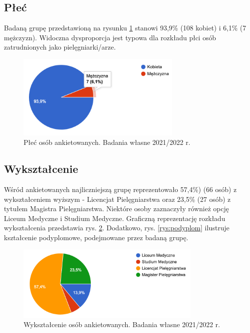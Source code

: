 \documentclass[a4paper,12pt,twoside,openright]{mwrep}
\begin{document}
\subsection*{Płeć}

Badaną grupę przedstawioną  na rysunku \ref{rys:plec} stanowi  93,9\%  (108 kobiet) i  6,1\%  (7 mężczyzn). Widoczna dysproporcja jest typowa dla rozkładu płci osób zatrudnionych jako pielęgniarki/arze.

\begin{figure}[H]
\centering
\includegraphics[width=8cm]{char_gr_bad/plec00}
\caption{Płeć osób ankietowanych. Badania własne 2021/2022 r.}
\label{rys:plec}
\end{figure}


\subsection*{Wykształcenie}


Wśród ankietowanych najliczniejszą grupę reprezentowało 57,4\%) (66 osób) z wykształceniem wyższym - Licencjat Pielęgniarstwa oraz  23,5\%  (27 osób) z tytułem Magistra Pielęgniarstwa. Niektóre osoby zaznaczyły również opcję Liceum Medyczne i  Studium Medyczne. Graficzną reprezentację rozkładu wykształcenia przedstawia rys. \ref{rys:wykszt}. Dodatkowo, rys. \ref{rys:podyplom} ilustruje kształcenie podyplomowe, podejmowane przez badaną grupę.


\begin{figure}[H]
\centering
\includegraphics[width=9cm]{char_gr_bad/wyksztalc00}
\caption{Wykształcenie osób ankietowanych. Badania własne 2021/2022 r.}
\label{rys:wykszt}
\end{figure}
\end{document}
